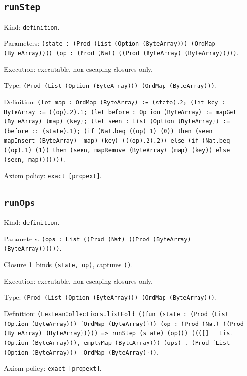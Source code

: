 \documentclass[11pt]{article}
\begin{document}
\subsection*{\texttt{runStep}}
\noindent Kind: \texttt{definition}.\par
\noindent Parameters: \texttt{(state : (Prod (List (Option (ByteArray))) (OrdMap (ByteArray)))) (op : (Prod (Nat) ((Prod (ByteArray) (ByteArray)))))}.\par
\noindent Execution: executable, non-escaping closures only.\par
\noindent Type: \texttt{(Prod (List (Option (ByteArray))) (OrdMap (ByteArray)))}.\par
\noindent Definition: \texttt{(let map : OrdMap (ByteArray) := (state).2; (let key : ByteArray := ((op).2).1; (let before : Option (ByteArray) := mapGet (ByteArray) (map) (key); (let seen : List (Option (ByteArray)) := (before :: (state).1); (if (Nat.beq ((op).1) (0)) then (seen, mapInsert (ByteArray) (map) (key) (((op).2).2)) else (if (Nat.beq ((op).1) (1)) then (seen, mapRemove (ByteArray) (map) (key)) else (seen, map)))))))}.\par
\noindent Axiom policy: \texttt{exact [propext]}.\par
\subsection*{\texttt{runOps}}
\noindent Kind: \texttt{definition}.\par
\noindent Parameters: \texttt{(ops : List ((Prod (Nat) ((Prod (ByteArray) (ByteArray))))))}.\par
\noindent Closure 1: binds \texttt{(state, op)}, captures \texttt{()}.\par
\noindent Execution: executable, non-escaping closures only.\par
\noindent Type: \texttt{(Prod (List (Option (ByteArray))) (OrdMap (ByteArray)))}.\par
\noindent Definition: \texttt{(LexLeanCollections.listFold ((fun (state : (Prod (List (Option (ByteArray))) (OrdMap (ByteArray)))) (op : (Prod (Nat) ((Prod (ByteArray) (ByteArray))))) => runStep (state) (op))) ((([] : List (Option (ByteArray))), emptyMap (ByteArray))) (ops) : (Prod (List (Option (ByteArray))) (OrdMap (ByteArray))))}.\par
\noindent Axiom policy: \texttt{exact [propext]}.\par
\end{document}
